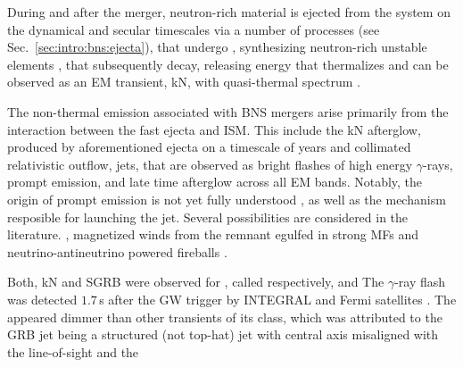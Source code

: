 During and after the merger, neutron-rich material is ejected from the system on the 
dynamical \cite{119, 120, 121, 15, 122} and secular \cite{123, 84, 24, 124, 21, 78, 81} 
timescales via a number of processes (see Sec.~\ref{sec:intro:bns:ejecta}), that 
undergo \rproc{} \nuc{}, synthesizing neutron-rich unstable elements \cite{82,15,12},
that subsequently decay, releasing energy that thermalizes and can be observed as 
an \ac{EM} transient, \ac{kN}, with quasi-thermal spectrum \cite{25}. 

The non-thermal emission associated with \ac{BNS} mergers arise primarily from the
interaction between the fast ejecta and \ac{ISM}\cite{23,Piran:2012wd}. This include the 
\ac{kN} afterglow,
produced by aforementioned ejecta on a timescale of years and collimated 
relativistic outflow, jets, that are observed as bright flashes of high energy $\gamma$-rays, 
prompt emission, and late time afterglow across all \ac{EM} bands. \cite{82,125} 
Notably, the origin of prompt emission is not yet fully understood \cite{Kumar:2014upa},
as well as the mechanism resposible for launching the jet. Several possibilities are 
considered in the literature.  \cite{126,76}, magnetized winds 
from the remnant egulfed in strong \acp{MF} \cite{109,75} and neutrino-antineutrino powered 
fireballs \cite{82}.

Both, \ac{kN} and \ac{SGRB} were observed for \GW{}, called respectively, \AT{} and \GRB{} 
\cite{kilonova observation list}
\cite{grb observation list}
The $\gamma$-ray flash was detected $1.7\,$s after the \ac{GW} trigger by INTEGRAL and 
Fermi satellites \cite{127}. The \GRB{} appeared dimmer than other transients of its class, 
which was attributed to the \ac{GRB} jet being a structured (not top-hat) jet with central axis
misaligned with the line-of-sight and the 
\cite{128,129}\cite{Refs of a struct jet model}


